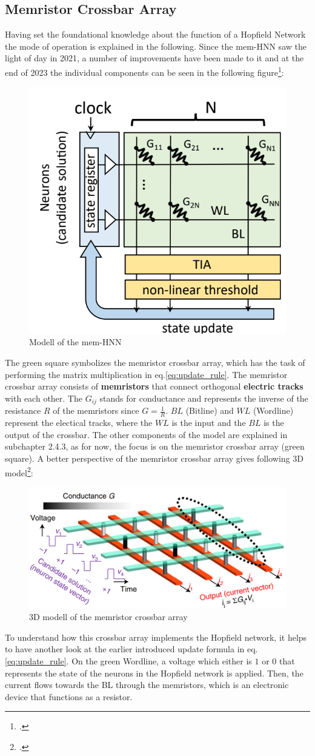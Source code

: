 \subsection{Memristor Crossbar Array}

Having set the foundational knowledge about the function of a Hopfield Network the mode of operation is explained in the following. 
Since the \ac{mem-HNN} saw the light of day in 2021, a number of improvements have been made to it and at the end of 2023 the individual components can be seen in the following figure\footcite[cf.][2]{hizzaniMemristorbasedHardwareAlgorithms2023}:
\begin{figure}[H]
    \centering
    \includegraphics[width=0.3\linewidth]{graphics/Mem_HNN_Modell.png}
    \caption{Modell of the mem-HNN}
    \label{ModellHMM}
\end{figure}
The green square symbolizes the memristor crossbar array, which has the task of performing the matrix multiplication in eq.\eqref{eq:update_rule}. 
The memristor crossbar array consists of \textbf{memristors} that connect orthogonal \textbf{electric tracks} with each other.
The \( G_{ij} \) stands for conductance and represents the inverse of the resistance \( R \) of the memristors since \( G = \frac{1}{R}\).
\( BL \) (Bitline) and \( WL \) (Wordline) represent the electical tracks, where the \( WL \) is the input and the \( BL \) is the output of the crossbar.
The other components of the model are explained in subchapter 2.4.3, as for now, the focus is on the memristor crossbar array (green square).
A better perspective of the memristor crossbar array gives following 3D model\footcite[cf.][410]{caiPowerefficientCombinatorialOptimization2020}:
\begin{figure}[H]
    \centering
    \includegraphics[width=0.65\linewidth]{graphics/memristor_crossbar_array.png}
    \caption{3D modell of the memristor crossbar array}
\end{figure}
To understand how this crossbar array implements the Hopfield network, it helps to have another look at the earlier introduced update formula in eq.\eqref{eq:update_rule}.
On the green Wordline, a voltage which either is \( 1 \) or \( 0 \) that represents the state of the neurons in the Hopfield network is applied.
Then, the current flows towards the BL through the memristors, which is an electronic device that functions as a resistor.

